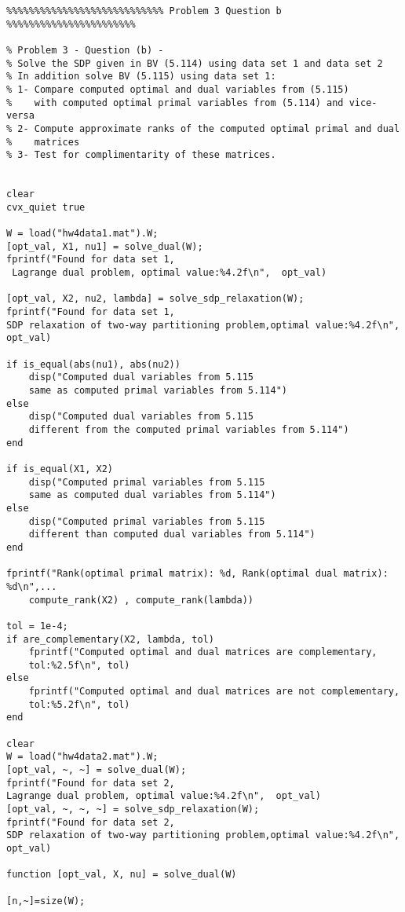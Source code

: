 \documentclass[11pt]{article}
\begin{document}
\begin{verbatim}
%%%%%%%%%%%%%%%%%%%%%%%%%%%% Problem 3 Question b %%%%%%%%%%%%%%%%%%%%%%%

% Problem 3 - Question (b) - 
% Solve the SDP given in BV (5.114) using data set 1 and data set 2
% In addition solve BV (5.115) using data set 1:
% 1- Compare computed optimal and dual variables from (5.115)
%    with computed optimal primal variables from (5.114) and vice-versa
% 2- Compute approximate ranks of the computed optimal primal and dual
%    matrices
% 3- Test for complimentarity of these matrices.


clear
cvx_quiet true

W = load("hw4data1.mat").W;
[opt_val, X1, nu1] = solve_dual(W);
fprintf("Found for data set 1,
 Lagrange dual problem, optimal value:%4.2f\n",  opt_val)

[opt_val, X2, nu2, lambda] = solve_sdp_relaxation(W);
fprintf("Found for data set 1, 
SDP relaxation of two-way partitioning problem,optimal value:%4.2f\n",  opt_val)

if is_equal(abs(nu1), abs(nu2))
    disp("Computed dual variables from 5.115 
    same as computed primal variables from 5.114")
else
    disp("Computed dual variables from 5.115 
    different from the computed primal variables from 5.114")
end

if is_equal(X1, X2)
    disp("Computed primal variables from 5.115 
    same as computed dual variables from 5.114")
else
    disp("Computed primal variables from 5.115
    different than computed dual variables from 5.114")
end

fprintf("Rank(optimal primal matrix): %d, Rank(optimal dual matrix): %d\n",...
    compute_rank(X2) , compute_rank(lambda))

tol = 1e-4;
if are_complementary(X2, lambda, tol)
    fprintf("Computed optimal and dual matrices are complementary, 
    tol:%2.5f\n", tol)
else    
    fprintf("Computed optimal and dual matrices are not complementary, 
    tol:%5.2f\n", tol)
end

clear
W = load("hw4data2.mat").W;
[opt_val, ~, ~] = solve_dual(W);
fprintf("Found for data set 2, 
Lagrange dual problem, optimal value:%4.2f\n",  opt_val)
[opt_val, ~, ~, ~] = solve_sdp_relaxation(W);
fprintf("Found for data set 2, 
SDP relaxation of two-way partitioning problem,optimal value:%4.2f\n",  opt_val)

function [opt_val, X, nu] = solve_dual(W)

[n,~]=size(W);


\end{verbatim}
\end{document}

